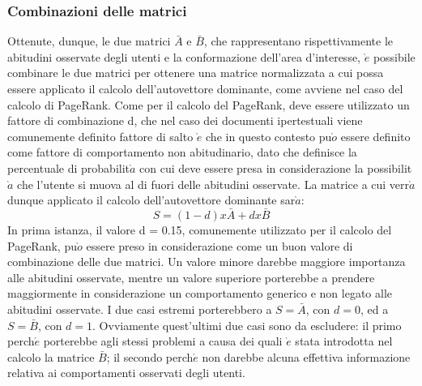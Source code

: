 \subsubsection{Combinazioni delle matrici}
Ottenute, dunque, le due matrici $\bar{A}$ e $\bar{B}$, che rappresentano rispettivamente
le abitudini osservate degli utenti e la conformazione dell'area d'interesse, $\grave{e}$
possibile combinare le due matrici per ottenere una matrice normalizzata a cui
possa essere applicato il calcolo dell'autovettore dominante, come avviene nel
caso del calcolo di PageRank. Come per il calcolo del PageRank, deve essere
utilizzato un fattore di combinazione d, che nel caso dei documenti ipertestuali
viene comunemente definito fattore di salto $\grave{e}$ che in questo contesto pu$\grave{o}$ essere
definito come fattore di comportamento non abitudinario, dato che definisce
la percentuale di probabilit$\grave{a}$ con cui deve essere presa in considerazione la
possibilit$\grave{a}$ che l'utente si muova al di fuori delle abitudini osservate. La matrice
a cui verr$\grave{a}$ dunque applicato il calcolo dell'autovettore dominante sar$\grave{a}$:
$$
S = (1 - d) x \bar{A} + d x \bar{B}
$$
In prima istanza, il valore d = 0.15, comunemente utilizzato per il calcolo del
PageRank, pu$\grave{o}$ essere preso in considerazione come un buon valore di combinazione
delle due matrici. Un valore minore darebbe maggiore importanza alle
abitudini osservate, mentre un valore superiore porterebbe a prendere maggiormente
in considerazione un comportamento generico e non legato alle abitudini
osservate. I due casi estremi porterebbero a $S = \bar{A}$, con $d = 0$,
ed a $S = \bar{B}$, con $d = 1$. Ovviamente quest'ultimi due casi sono da
escludere: il primo perch$\acute{e}$ porterebbe agli stessi problemi a causa dei quali $\grave{e}$
stata introdotta nel calcolo la matrice $\bar{B}$; il secondo perch$\acute{e}$ non darebbe
alcuna effettiva informazione relativa ai comportamenti osservati degli utenti.


